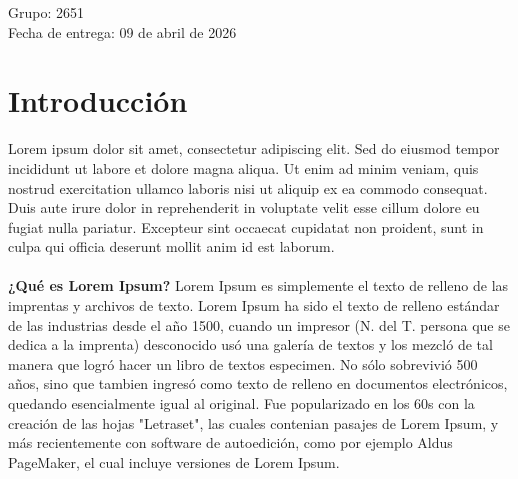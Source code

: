 \documentclass[letterpaper, 12pt]{article}
\begin{document}
\begin{titlepage}
\begin{center}
            Grupo: 2651 \\ \vspace{0.8cm}
            \hspace{5.5cm} Fecha de entrega: 09 de abril de 2026 

            
        \end{center}
            
    
        \restoregeometry
    \end{titlepage}

    \tableofcontents
   
    \listoffigures %

    \listoftables %

     \newpage

    \section*{Introducción}
    Lorem ipsum dolor sit amet, consectetur adipiscing elit. Sed do eiusmod tempor incididunt ut labore et dolore 
    magna aliqua. Ut enim ad minim veniam, quis nostrud exercitation ullamco laboris nisi ut aliquip ex ea commodo 
    consequat. Duis aute irure dolor in reprehenderit in voluptate velit esse cillum dolore eu fugiat nulla pariatur. 
    Excepteur sint occaecat cupidatat non proident, sunt in culpa qui officia deserunt mollit anim id est laborum.\\ \\
    \textbf{¿Qué es Lorem Ipsum?}
    Lorem Ipsum es simplemente el texto de relleno de las imprentas y archivos de texto. Lorem Ipsum ha sido el texto 
    de relleno estándar de las industrias desde el año 1500, cuando un impresor (N. del T. persona que se dedica a la imprenta) 
    desconocido usó una galería de textos y los mezcló de tal manera que logró hacer un libro de textos especimen. 
    No sólo sobrevivió 500 años, sino que tambien ingresó como texto de relleno en documentos electrónicos, quedando 
    esencialmente igual al original. Fue popularizado en los 60s con la creación de las hojas "Letraset", las cuales 
    contenian pasajes de Lorem Ipsum, y más recientemente con software de autoedición, como por ejemplo Aldus PageMaker, 
    el cual incluye versiones de Lorem Ipsum.\\ \\
\end{document}
